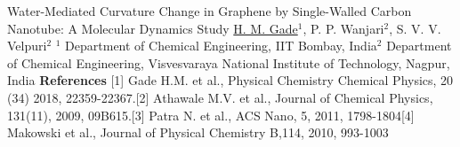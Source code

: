 \begin{abstract_online}{Water-Mediated Curvature Change in Graphene by Single-Walled Carbon Nanotube: A Molecular Dynamics Study}{%
        \underline{H. M. Gade}$^{1}$, P. P. Wanjari$^{2}$, S. V. V. Velpuri$^{2}$}{%
        }{%
        $^1$ Department of Chemical Engineering, IIT Bombay, India\newline{}$^2$ Department of Chemical Engineering, Visvesvaraya National Institute of Technology, Nagpur, India}
        \textbf{References} \newline{}[1] Gade H.M. et al., Physical Chemistry Chemical Physics, 20 (34) 2018, 22359-22367.\newline{}[2] Athawale M.V. et al., Journal of Chemical Physics, 131(11), 2009, 09B615.\newline{}[3] Patra N. et al., ACS Nano, 5, 2011, 1798-1804\newline{}[4] Makowski et al., Journal of Physical Chemistry B,114, 2010, 993-1003 
    \end{abstract_online}
    
